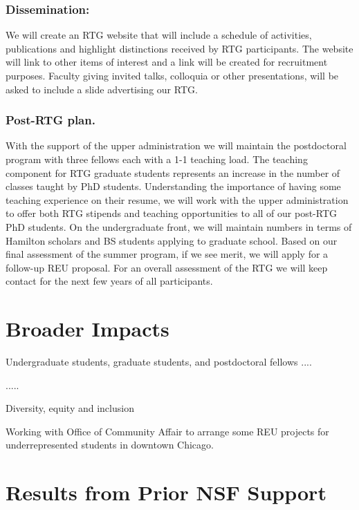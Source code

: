 \documentclass[11pt]{article}
\begin{document}
 \subsubsection{Dissemination:} 
 We will create an RTG website that will include a schedule of activities, publications and highlight
distinctions received by RTG participants. The website will link to other items of interest and a link will
be created for recruitment purposes. Faculty giving invited talks, colloquia or other presentations, will be
asked to include a slide advertising our RTG.

 
 \subsubsection{Post-RTG plan.}

With the support of the upper administration we will maintain the postdoctoral program with three
fellows each with a 1-1 teaching load. The teaching component for RTG graduate students represents
an increase in the number of classes taught by PhD students. Understanding the importance of having
some teaching experience on their resume, we will work with the upper administration to offer both RTG
stipends and teaching opportunities to all of our post-RTG PhD students. On the undergraduate front, we
will maintain numbers in terms of Hamilton scholars and BS students applying to graduate school. Based on
our final assessment of the summer program, if we see merit, we will apply for a follow-up REU proposal.
For an overall assessment of the RTG we will keep contact for the next few years of all participants.



\section{Broader Impacts}
 


 Undergraduate students, graduate students, and postdoctoral fellows ....   
 

.....

Diversity, equity and inclusion

 Working with Office of Community Affair to arrange some REU projects for underrepresented students in downtown Chicago.

\section{Results from Prior NSF Support}
\end{document}
